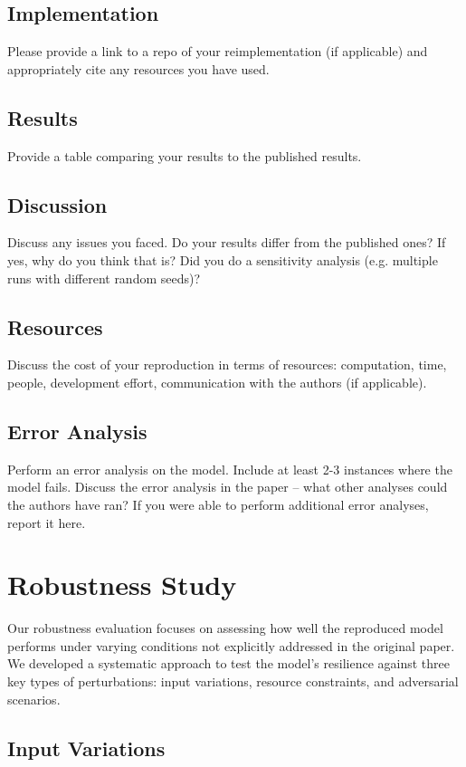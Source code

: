\documentclass[11pt,a4paper]{article}
\begin{document}
\subsection{Implementation} 
Please provide a link to a repo of your reimplementation (if applicable) and appropriately cite any resources you have used.

\subsection{Results}
Provide a table comparing your results to the published results.

\subsection{Discussion}
Discuss any issues you faced. Do your results differ from the published ones? If yes, why do you think that is? Did you do a sensitivity analysis (e.g. multiple runs with different random seeds)?

\subsection{Resources}
Discuss the cost of your reproduction in terms of resources: computation, time, people, development effort, communication with the authors (if applicable).


\subsection{Error Analysis}
Perform an error analysis on the model. Include at least 2-3 instances where the model fails. Discuss the error analysis in the paper -- what other analyses could the authors have ran? If you were able to perform additional error analyses, report it here.

\section{Robustness Study}

Our robustness evaluation focuses on assessing how well the reproduced model performs under varying conditions not explicitly addressed in the original paper. We developed a systematic approach to test the model's resilience against three key types of perturbations: input variations, resource constraints, and adversarial scenarios.

\subsection{Input Variations}
\end{document}
